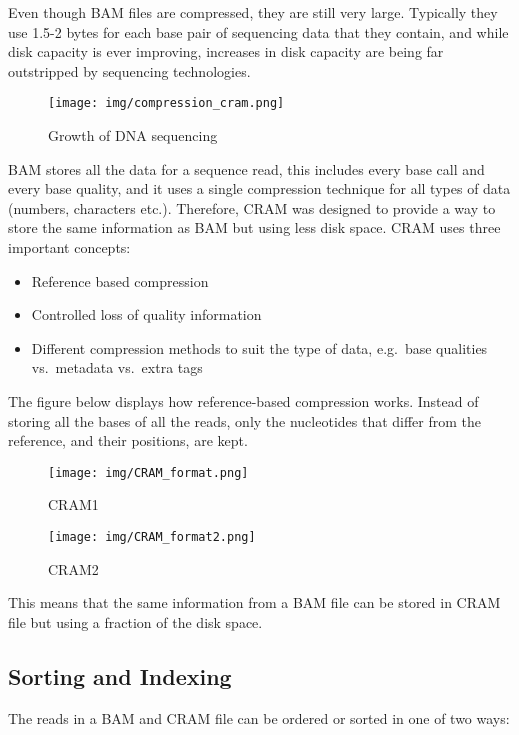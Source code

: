 \documentclass[11pt]{article}
\providecommand{\tightlist}{%
      \setlength{\itemsep}{0pt}\setlength{\parskip}{0pt}}
\begin{document}
Even though BAM files are compressed, they are still very large.
Typically they use 1.5-2 bytes for each base pair of sequencing data
that they contain, and while disk capacity is ever improving, increases
in disk capacity are being far outstripped by sequencing technologies.

    \begin{figure}
\centering
\texttt{[image: img/compression\_cram.png]}
\caption{Growth of DNA sequencing}
\end{figure}

    BAM stores all the data for a sequence read, this includes every base
call and every base quality, and it uses a single compression technique
for all types of data (numbers, characters etc.). Therefore, CRAM was
designed to provide a way to store the same information as BAM but using
less disk space. CRAM uses three important concepts:

\begin{itemize}
\tightlist
\item
  Reference based compression
\item
  Controlled loss of quality information
\item
  Different compression methods to suit the type of data, e.g.~base
  qualities vs.~metadata vs.~extra tags
\end{itemize}

The figure below displays how reference-based compression works. Instead
of storing all the bases of all the reads, only the nucleotides that
differ from the reference, and their positions, are kept.

    \begin{figure}
\centering
\texttt{[image: img/CRAM\_format.png]}
\caption{CRAM1}
\end{figure}

    \begin{figure}
\centering
\texttt{[image: img/CRAM\_format2.png]}
\caption{CRAM2}
\end{figure}

    This means that the same information from a BAM file can be stored in
CRAM file but using a fraction of the disk space.

    \hypertarget{sorting-and-indexing}{%
\subsection{Sorting and Indexing}\label{sorting-and-indexing}}

The reads in a BAM and CRAM file can be ordered or sorted in one of two
ways:
\end{document}
